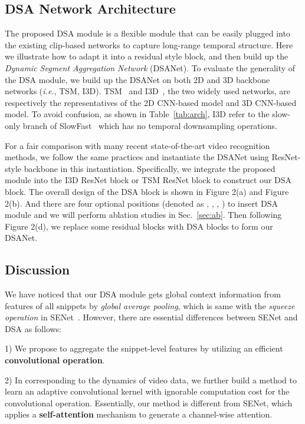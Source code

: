 \documentclass[sigconf]{acmart}
\newcommand{\RNum}[1]{\uppercase\expandafter{\romannumeral #1\relax}}
\begin{document}
\subsection{DSA Network Architecture}
The proposed DSA module is a flexible module that can be easily plugged into the existing clip-based networks to capture long-range temporal structure. 
Here we illustrate how to adapt it into a residual style block, and then build up the \emph{Dynamic Segment Aggregation Network} (DSANet).
To evaluate the generality of the DSA module, we build up the DSANet on both 2D and 3D backbone networks (\emph{i.e.}, TSM, I3D). 
TSM~\cite{tsm} and I3D~\cite{slowfast}, the two widely used networks, are respectively the representatives of the 2D CNN-based model and 3D CNN-based model.
To avoid confusion, as shown in Table~\ref{tab:arch}, I3D refer to the slow-only branch of SlowFast~\cite{slowfast} which has no temporal downsampling operations. 

For a fair comparison with many recent state-of-the-art video recognition methods, we follow the same practices and instantiate the DSANet using ResNet-style backbone in this instantiation. 
Specifically, we integrate the proposed module into the I3D ResNet block or TSM ResNet block to construct our DSA block. The overall design of the DSA block is shown in Figure 2(a) and Figure 2(b). And there are four optional positions (denoted as \RNum{1}, \RNum{2}, \RNum{3}, \RNum{4}) to insert DSA module and we will perform ablation studies in Sec.~\ref{sec:ab}.
Then following Figure 2(d), we replace some residual blocks with DSA blocks to form our DSANet.






\subsection{Discussion}
We have noticed that our DSA module gets global context information from features of all snippets by \emph{global average pooling}, which is same with the \emph{squeeze operation} in SENet~\cite{senet}.
However, there are essential differences between SENet and DSA as follows:

1) We propose to aggregate the snippet-level features by utilizing an efficient \textbf{convolutional operation}.

2) In corresponding to the dynamics of video data, we further build a method to learn an adaptive convolutional kernel with ignorable computation cost for the convolutional operation. Essentially, our method is different from SENet, which applies a \textbf{self-attention} mechanism to generate a channel-wise attention.
\end{document}
